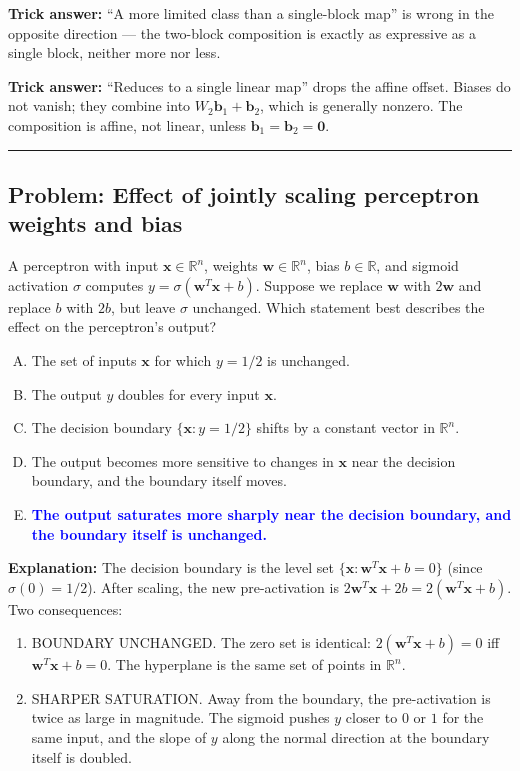 \documentclass[12pt]{amsart}
\newcommand{\divider}{
  \vspace{-1em}
  \noindent
  \raisebox{-0.15ex}{\textbullet}%
  \hspace{0.5em}%
  \rule[0.5ex]{0.95\textwidth}{1.0pt}%
  \hspace{0.5em}%
  \raisebox{-0.15ex}{\textbullet}%
  \vspace{0em}
}
\begin{document}
\textbf{Trick answer:}
``A more limited class than a single-block map'' is wrong in the opposite
direction --- the two-block composition is exactly as expressive as a
single block, neither more nor less.

\textbf{Trick answer:}
``Reduces to a single linear map'' drops the affine offset. Biases do not
vanish; they combine into $W_2\mathbf{b}_1 + \mathbf{b}_2$, which is
generally nonzero. The composition is affine, not linear, unless
$\mathbf{b}_1 = \mathbf{b}_2 = \mathbf{0}$.

\divider

\subsection*{Problem: Effect of jointly scaling perceptron weights and bias}

A perceptron with input $\mathbf{x} \in \mathbb{R}^n$, weights
$\mathbf{w} \in \mathbb{R}^n$, bias $b \in \mathbb{R}$, and sigmoid activation
$\sigma$ computes $y = \sigma(\mathbf{w}^T\mathbf{x} + b)$.
Suppose we replace $\mathbf{w}$ with $2\mathbf{w}$ and replace $b$ with $2b$,
but leave $\sigma$ unchanged. Which statement best describes the effect on
the perceptron's output?

\begin{enumerate}[(A)]
\item The set of inputs $\mathbf{x}$ for which $y = 1/2$ is unchanged.
\item The output $y$ doubles for every input $\mathbf{x}$.
\item The decision boundary $\{\mathbf{x}: y = 1/2\}$ shifts by a constant
vector in $\mathbb{R}^n$.
\item The output becomes more sensitive to changes in $\mathbf{x}$ near the
decision boundary, and the boundary itself moves.
\item \textcolor{blue}{\textbf{The output saturates more sharply near the decision boundary, and the boundary itself is unchanged.}}
\end{enumerate}

\textbf{Explanation:}
The decision boundary is the level set
$\{\mathbf{x} : \mathbf{w}^T\mathbf{x} + b = 0\}$ (since $\sigma(0) = 1/2$).
After scaling, the new pre-activation is
$2\mathbf{w}^T\mathbf{x} + 2b = 2(\mathbf{w}^T\mathbf{x} + b)$.
Two consequences:
\begin{enumerate}[(1)]
\item BOUNDARY UNCHANGED. The zero set is identical:
$2(\mathbf{w}^T\mathbf{x} + b) = 0$ iff $\mathbf{w}^T\mathbf{x} + b = 0$.
The hyperplane is the same set of points in $\mathbb{R}^n$.
\item SHARPER SATURATION. Away from the boundary, the pre-activation is twice
as large in magnitude. The sigmoid pushes $y$ closer to $0$ or $1$ for the
same input, and the slope of $y$ along the normal direction at the boundary
itself is doubled.
\end{enumerate}
\end{document}
